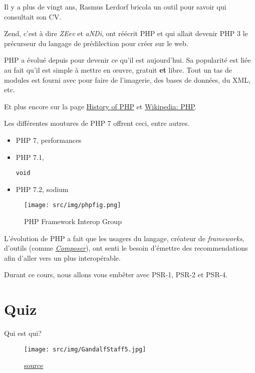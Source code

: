 Il y a plus de vingt ans, Rasmus Lerdorf bricola un outil pour savoir
qui consultait son CV.

Zend, c'est à dire \emph{ZEev} et \emph{aNDi}, ont réécrit PHP et qui
allait devenir PHP 3 le précurseur du langage de prédilection pour créer
sur le web.

PHP a évolué depuis pour devenir ce qu'il est aujourd'hui. Sa popularité
est liée au fait qu'il est simple à mettre en œuvre, gratuit \textbf{et}
libre. Tout un tas de modules est fourni avec pour faire de l'imagerie,
des bases de données, du XML, etc.

Et plus encore sur la page
\href{http://php.net/manual/en/history.php.php}{History of PHP} et
\href{https://en.wikipedia.org/wiki/PHP}{Wikipedia: PHP}.

Les différentes moutures de PHP 7 offrent ceci, entre autres.

\begin{itemize}
\tightlist
\item
  PHP 7, performances
\item
  PHP 7.1,
  \begin{otherlanguage}{english}\texttt{void}\end{otherlanguage}
\item
  PHP 7.2, sodium
\end{itemize}

\begin{figure}
\centering
\texttt{[image: src/img/phpfig.png]}
\caption{PHP Framework Interop Group}
\end{figure}

L'évolution de PHP a fait que les usagers du langage, créateur de
\emph{frameworks}, d'outils (comme
\href{http://getcomposer.org/}{\emph{Composer}}), ont senti le besoin
d'émettre des recommendations afin d'aller vers un plus interopérable.

Durant ce cours, nous allons vous embêter avec PSR-1, PSR-2 et PSR-4.

\hypertarget{quiz}{%
\section{Quiz}\label{quiz}}

Qui est qui?

\begin{figure}
\centering
\texttt{[image: src/img/GandalfStaff5.jpg]}
\caption{\href{http://hero.wikia.com/wiki/Gandalf}{source}}
\end{figure}

